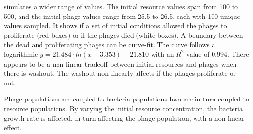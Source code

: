  simulates a wider range of values. 
The initial resource values span from 100 to 500, and the initial phage values range from 25.5 to 26.5, each with 100 unique values sampled.
It shows if a set of initial conditions allowed the phages to proliferate (red boxes) or if the phages died (white boxes). 
A boundary between the dead and proliferating phages can be curve-fit. 
The curve follows a logarithmic $y=21.484\cdot ln(x+3.353)-21.810$ with an $R^2$ value of 0.994. 
There appears to be a non-linear tradeoff between initial resources and phages when there is washout. 
The washout non-linearly affects if the phages proliferate or not. 

Phage populations are coupled to bacteria populations hwo are in turn coupled to resource populations. 
By varying the initial resource concentration, the bacteria growth rate is affected, in turn affecting the phage population, with a non-linear effect. 




